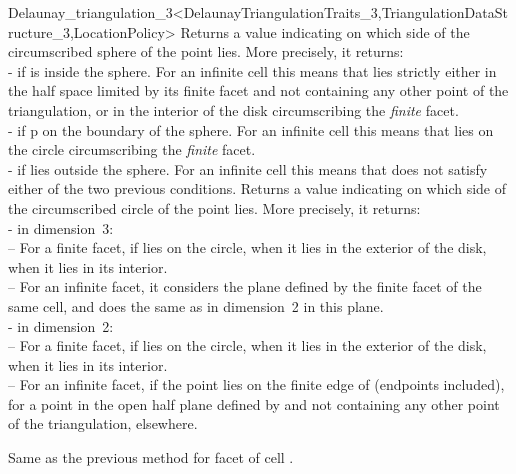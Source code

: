 \begin{ccRefClass}{Delaunay_triangulation_3<DelaunayTriangulationTraits_3,TriangulationDataStructure_3,LocationPolicy>}
{Returns a value indicating on which side of the circumscribed sphere
of  the point  lies. More precisely, it returns:\\
-  if  is inside the sphere. For an infinite
cell this means that  lies strictly either in the half space
limited by its finite facet and not containing any other point of the
triangulation, or in the interior of the disk circumscribing the
\textit{finite} facet. \\ 
-  if p on the boundary of the sphere. For an infinite
cell this means that  lies on the circle circumscribing
the \textit{finite} facet.\\ 
-  if  lies outside the sphere. For an
infinite cell this means that  does not satisfy either of the
two previous conditions. 
}
{Returns a value indicating on which side of the circumscribed circle
of  the point  lies. More precisely, it returns:\\
- in dimension~3:\\
-- For a finite facet,  if  lies
on the circle,  when it lies in the exterior of
the disk,  when it lies in its interior.\\
-- For an infinite facet, it considers the plane defined by the finite
facet of the same cell, and does the same as in dimension~2 in this
plane.\\
- in dimension~2:\\
-- For a finite facet,  if  lies
on the circle,  when it lies in the exterior of
the disk,  when it lies in its interior.\\
-- For an infinite facet,  if the
point lies on the finite edge of  (endpoints included),
 for a point in the open half plane defined
by  and not containing any other point of the triangulation,
 elsewhere. 
}

{Same as the previous method for facet  of cell .}


\end{ccRefClass}
